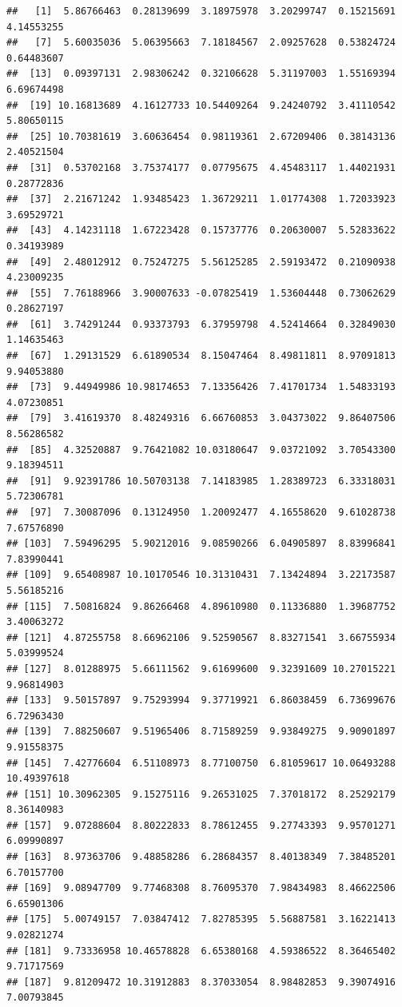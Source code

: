 \documentclass[
]{book}
\begin{document}
\begin{verbatim}
##   [1]  5.86766463  0.28139699  3.18975978  3.20299747  0.15215691  4.14553255
##   [7]  5.60035036  5.06395663  7.18184567  2.09257628  0.53824724  0.64483607
##  [13]  0.09397131  2.98306242  0.32106628  5.31197003  1.55169394  6.69674498
##  [19] 10.16813689  4.16127733 10.54409264  9.24240792  3.41110542  5.80650115
##  [25] 10.70381619  3.60636454  0.98119361  2.67209406  0.38143136  2.40521504
##  [31]  0.53702168  3.75374177  0.07795675  4.45483117  1.44021931  0.28772836
##  [37]  2.21671242  1.93485423  1.36729211  1.01774308  1.72033923  3.69529721
##  [43]  4.14231118  1.67223428  0.15737776  0.20630007  5.52833622  0.34193989
##  [49]  2.48012912  0.75247275  5.56125285  2.59193472  0.21090938  4.23009235
##  [55]  7.76188966  3.90007633 -0.07825419  1.53604448  0.73062629  0.28627197
##  [61]  3.74291244  0.93373793  6.37959798  4.52414664  0.32849030  1.14635463
##  [67]  1.29131529  6.61890534  8.15047464  8.49811811  8.97091813  9.94053880
##  [73]  9.44949986 10.98174653  7.13356426  7.41701734  1.54833193  4.07230851
##  [79]  3.41619370  8.48249316  6.66760853  3.04373022  9.86407506  8.56286582
##  [85]  4.32520887  9.76421082 10.03180647  9.03721092  3.70543300  9.18394511
##  [91]  9.92391786 10.50703138  7.14183985  1.28389723  6.33318031  5.72306781
##  [97]  7.30087096  0.13124950  1.20092477  4.16558620  9.61028738  7.67576890
## [103]  7.59496295  5.90212016  9.08590266  6.04905897  8.83996841  7.83990441
## [109]  9.65408987 10.10170546 10.31310431  7.13424894  3.22173587  5.56185216
## [115]  7.50816824  9.86266468  4.89610980  0.11336880  1.39687752  3.40063272
## [121]  4.87255758  8.66962106  9.52590567  8.83271541  3.66755934  5.03999524
## [127]  8.01288975  5.66111562  9.61699600  9.32391609 10.27015221  9.96814903
## [133]  9.50157897  9.75293994  9.37719921  6.86038459  6.73699676  6.72963430
## [139]  7.88250607  9.51965406  8.71589259  9.93849275  9.90901897  9.91558375
## [145]  7.42776604  6.51108973  8.77100750  6.81059617 10.06493288 10.49397618
## [151] 10.30962305  9.15275116  9.26531025  7.37018172  8.25292179  8.36140983
## [157]  9.07288604  8.80222833  8.78612455  9.27743393  9.95701271  6.09990897
## [163]  8.97363706  9.48858286  6.28684357  8.40138349  7.38485201  6.70157700
## [169]  9.08947709  9.77468308  8.76095370  7.98434983  8.46622506  6.65901306
## [175]  5.00749157  7.03847412  7.82785395  5.56887581  3.16221413  9.02821274
## [181]  9.73336958 10.46578828  6.65380168  4.59386522  8.36465402  9.71717569
## [187]  9.81209472 10.31912883  8.37033054  8.98482853  9.39074916  7.00793845

\end{verbatim}
\end{document}
